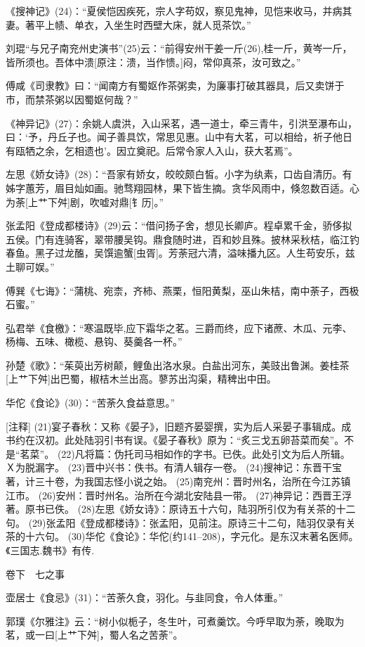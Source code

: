 \documentclass[12pt,UTF8]{ctexbook}
\begin{document}
《搜神记》(24)：“夏侯恺因疾死，宗人字苟奴，察见鬼神，见恺来收马，并病其妻。著平上帻、单衣，入坐生时西壁大床，就人觅茶饮。”

刘琨“与兄子南兖州史演书”(25)云：“前得安州干姜一斤(26),桂一斤，黄岑一斤，皆所须也。吾体中溃[原注：溃，当作愦。]闷，常仰真茶，汝可致之。”

傅咸《司隶教》曰：“闻南方有蜀妪作茶粥卖，为廉事打破其器具，后又卖饼于市，而禁茶粥以因蜀妪何哉？”

《神异记》(27)：余姚人虞洪，入山采茗，遇一道士，牵三青牛，引洪至瀑布山，曰：‘予，丹丘子也。闻子善具饮，常思见惠。山中有大茗，可以相给，祈子他日有瓯牺之余，乞相遗也’。因立奠祀。后常令家人入山，获大茗焉”。

左思《娇女诗》(28)：“吾家有娇女，皎皎颇白皙。小字为纨素，口齿自清历。有姊字蕙芳，眉目灿如画。驰骛翔园林，果下皆生摘。贪华风雨中，倏忽数百适。心为荼[上艹下舛]剧，吹嘘对鼎[钅历]。”

张孟阳《登成都楼诗》(29)云：“借问扬子舍，想见长卿庐。程卓累千金，骄侈拟五侯。门有连骑客，翠带腰吴钩。鼎食随时进，百和妙且殊。披林采秋桔，临江钓春鱼。黑子过龙醢，吴馔逾蟹[虫胥]。芳荼冠六清，溢味播九区。人生苟安乐，兹土聊可娱。”

傅巽《七诲》：“蒲桃、宛柰，齐柿、燕栗，恒阳黄梨，巫山朱桔，南中荼子，西极石蜜。”

弘君举《食檄》：“寒温既毕,应下霜华之茗。三爵而终，应下诸蔗、木瓜、元李、杨梅、五味、橄榄、悬钩、葵羹各一杯。”

孙楚《歌》：“茱萸出芳树颠，鲤鱼出洛水泉。白盐出河东，美豉出鲁渊。姜桂茶[上艹下舛]出巴蜀，椒桔木兰出高。蓼苏出沟渠，精稗出中田。

华佗《食论》(30)：“苦荼久食益意思。”

[注释]
(21)宴子春秋：又称《晏子》，旧题齐晏婴撰，实为后人采晏子事辑成。成书约在汉初。此处陆羽引书有误。《晏子春秋》原为：“炙三戈五卵苔菜而矣”。不是“茗菜”。
(22)凡将篇：伪托司马相如作的字书。已佚。此处引文为后人所辑。Ｘ为脱漏字。
(23)晋中兴书：佚书。有清人辑存一卷。
(24)搜神记：东晋干宝著，计三十卷，为我国志怪小说之始。
(25)南兖州：晋时州名，治所在今江苏镇江市。
(26)安州：晋时州名。治所在今湖北安陆县一带。
(27)神异记：西晋王浮著。原书已佚。
(28)左思《娇女诗》：原诗五十六句，陆羽所引仅为有关茶的十二句。
(29)张孟阳《登成都楼诗》：张孟阳，见前注。原诗三十二句，陆羽仅录有关茶的十六句。
(30)华佗《食论》：华佗(约141--208)，字元化。是东汉末著名医师。《三国志.魏书》有传.

卷下　七之事

壶居士《食忌》(31)：“苦荼久食，羽化。与韭同食，令人体重。”

郭璞《尔雅注》云：“树小似栀子，冬生叶，可煮羹饮。今呼早取为荼，晚取为茗，或一曰[上艹下舛]，蜀人名之苦荼”。
\end{document}
